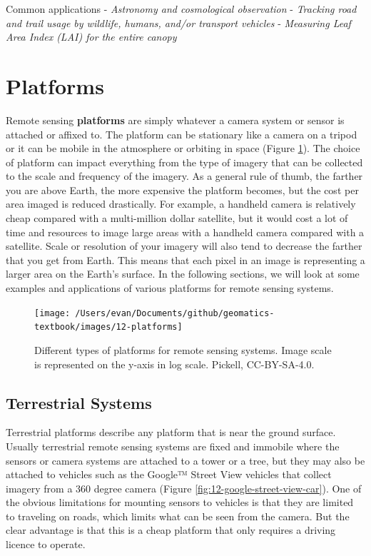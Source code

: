\documentclass[
]{book}
\begin{document}
Common applications
- \emph{Astronomy and cosmological observation}
- \emph{Tracking road and trail usage by wildlife, humans, and/or transport vehicles}
- \emph{Measuring Leaf Area Index (LAI) for the entire canopy}

\hypertarget{platforms}{%
\section{Platforms}\label{platforms}}

Remote sensing \textbf{platforms} are simply whatever a camera system or sensor is attached or affixed to. The platform can be stationary like a camera on a tripod or it can be mobile in the atmosphere or orbiting in space (Figure \ref{fig:12-platforms}). The choice of platform can impact everything from the type of imagery that can be collected to the scale and frequency of the imagery. As a general rule of thumb, the farther you are above Earth, the more expensive the platform becomes, but the cost per area imaged is reduced drastically. For example, a handheld camera is relatively cheap compared with a multi-million dollar satellite, but it would cost a lot of time and resources to image large areas with a handheld camera compared with a satellite. Scale or resolution of your imagery will also tend to decrease the farther that you get from Earth. This means that each pixel in an image is representing a larger area on the Earth's surface. In the following sections, we will look at some examples and applications of various platforms for remote sensing systems.

\begin{figure}
\texttt{[image: /Users/evan/Documents/github/geomatics-textbook/images/12-platforms]} \caption{Different types of platforms for remote sensing systems. Image scale is represented on the y-axis in log scale. Pickell, CC-BY-SA-4.0.}\label{fig:12-platforms}
\end{figure}

\hypertarget{terrestrial-systems}{%
\subsection{Terrestrial Systems}\label{terrestrial-systems}}

Terrestrial platforms describe any platform that is near the ground surface. Usually terrestrial remote sensing systems are fixed and immobile where the sensors or camera systems are attached to a tower or a tree, but they may also be attached to vehicles such as the Google™ Street View vehicles that collect imagery from a 360 degree camera (Figure \ref{fig:12-google-street-view-car}). One of the obvious limitations for mounting sensors to vehicles is that they are limited to traveling on roads, which limits what can be seen from the camera. But the clear advantage is that this is a cheap platform that only requires a driving licence to operate.
\end{document}
